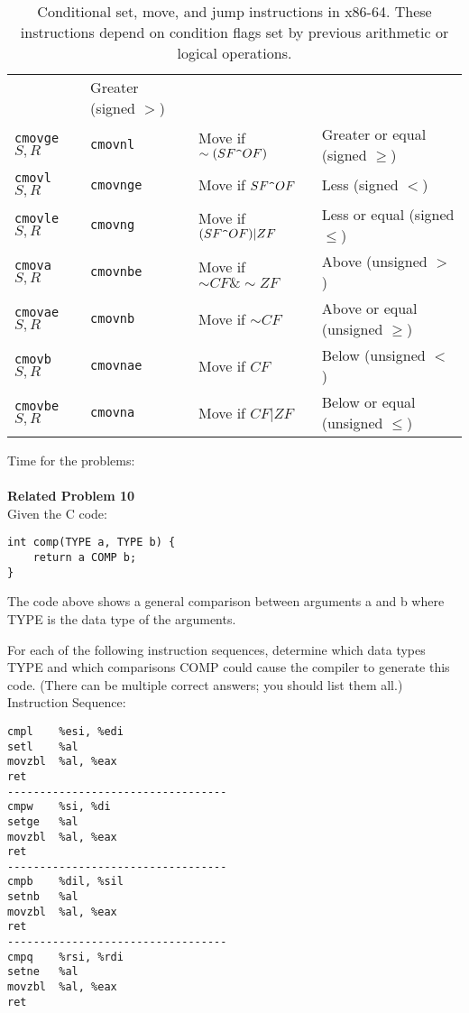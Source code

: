 \begin{table}[h]
\begin{tabular}{l l l l}
        & Greater (signed $>$) \\
        \texttt{cmovge} $S, R$  & \texttt{cmovnl} & Move if $\sim (SF \texttt{\string^} OF)$ 
        & Greater or equal (signed $\geq$) \\
        \texttt{cmovl} $S, R$  & \texttt{cmovnge} & Move if $SF \texttt{\string^} OF$ & Less (signed $<$) \\
        \texttt{cmovle} $S, R$  & \texttt{cmovng} & Move if $(SF \texttt{\string^} OF) | ZF$ 
        & Less or equal (signed $\leq$) \\
        \texttt{cmova} $S, R$  & \texttt{cmovnbe} & Move if $\sim CF \& \sim ZF$ 
        & Above (unsigned $>$) \\
        \texttt{cmovae} $S, R$  & \texttt{cmovnb} & Move if $\sim CF$ 
        & Above or equal (unsigned $\geq$) \\
        \texttt{cmovb} $S, R$  & \texttt{cmovnae} & Move if $CF$ 
        & Below (unsigned $<$) \\
        \texttt{cmovbe} $S, R$  & \texttt{cmovna} & Move if $CF | ZF$ 
        & Below or equal (unsigned $\leq$) \\
        \bottomrule
    \end{tabular}
    \caption{Conditional set, move, and jump instructions in x86-64. These instructions 
    depend on condition flags set by previous arithmetic or logical operations.}
    \label{set-and-jmp}
\end{table}

\clearpage
\noindent Time for the problems: \\
\\
\noindent\textbf{Related Problem 10}  \\
Given the C code:
\begin{verbatim}
int comp(TYPE a, TYPE b) {
    return a COMP b;
}
\end{verbatim}
The code above shows a general comparison between arguments a and b
where TYPE  is the data type of the arguments.

For each of the following instruction sequences, determine which data 
types TYPE and which comparisons COMP could cause the compiler to 
generate this code. (There can be multiple correct answers; you should 
list them all.)
\noindent Instruction Sequence:
\begin{verbatim}
cmpl    %esi, %edi
setl    %al
movzbl  %al, %eax
ret
----------------------------------
cmpw    %si, %di
setge   %al
movzbl  %al, %eax
ret
----------------------------------
cmpb    %dil, %sil
setnb   %al
movzbl  %al, %eax
ret
----------------------------------
cmpq    %rsi, %rdi
setne   %al
movzbl  %al, %eax
ret
\end{verbatim}

